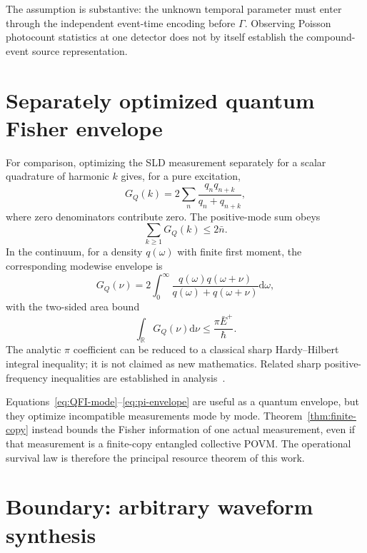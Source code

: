 \documentclass[aps,pra,reprint,amsmath,amssymb,longbibliography]{revtex4-2}
\newcommand{\dd}{\mathrm{d}}
\begin{document}
The assumption is substantive: the unknown temporal parameter must enter through the independent event-time encoding before $\Gamma$.  Observing Poisson photocount statistics at one detector does not by itself establish the compound-event source representation.

\section{Separately optimized quantum Fisher envelope}
\label{sec:qfi-envelope}

For comparison, optimizing the SLD measurement separately for a scalar quadrature of harmonic $k$ gives, for a pure excitation,
\begin{equation}
 G_Q(k)=2\sum_n\frac{q_nq_{n+k}}{q_n+q_{n+k}},
 \label{eq:QFI-mode}
\end{equation}
where zero denominators contribute zero.  The positive-mode sum obeys
\begin{equation}
 \sum_{k\geq1}G_Q(k)\leq2\bar n.
 \label{eq:QFI-discrete-sum}
\end{equation}
In the continuum, for a density $q(\omega)$ with finite first moment, the corresponding modewise envelope is
\begin{equation}
 G_Q(\nu)=2\int_0^\infty
 \frac{q(\omega)q(\omega+\nu)}{q(\omega)+q(\omega+\nu)}\dd\omega,
\end{equation}
with the two-sided area bound
\begin{equation}
 \int_{\mathbb R}G_Q(\nu)\dd\nu
 \leq\frac{\pi\bar E^+}{\hbar}.
 \label{eq:pi-envelope}
\end{equation}
The analytic $\pi$ coefficient can be reduced to a classical sharp Hardy--Hilbert integral inequality; it is not claimed as new mathematics.  Related sharp positive-frequency inequalities are established in analysis~\cite{Pocovnicu2011}.

Equations~\eqref{eq:QFI-mode}--\eqref{eq:pi-envelope} are useful as a quantum envelope, but they optimize incompatible measurements mode by mode.  Theorem~\ref{thm:finite-copy} instead bounds the Fisher information of one actual measurement, even if that measurement is a finite-copy entangled collective POVM.  The operational survival law is therefore the principal resource theorem of this work.

\section{Boundary: arbitrary waveform synthesis}
\label{sec:no-go}
\end{document}
